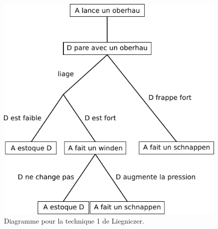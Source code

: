 \begin{technique}[Liegniczer 1]
\begin{figure}[htp]
	\centering
	\includegraphics{diagrammes/epee_bocle/liegniczer_1}
	\caption{Diagramme pour la technique 1 de Liegniczer.}
	\label{épée-bocle:fig:diagramme-liegniczer-1}
\end{figure}


\end{technique}



